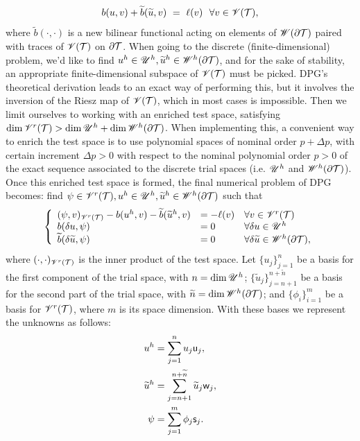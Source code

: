 % 
\begin{equation}
    b(u,v)+\widetilde{b}(\widetilde{u},v)\ =\ \ell(v)\ \ \forall v\in\mathscr{V}(\mathcal{T}),
\label{brokenvar}
\end{equation}
% 
where $\tilde{b}(\cdot,\cdot)$ is a new bilinear functional acting on elements of $\mathscr{W}(\partial\mathcal{T})$ paired with traces of $\mathscr{V}(\mathcal{T})$ on $\partial\mathcal{T}$. When going to the discrete (finite-dimensional) problem, we'd like to find $u^h\in\mathscr{U}^h, \widetilde{u}^h\in\mathscr{W}^h(\partial\mathcal{T})$, and for the sake of stability, an appropriate finite-dimensional subspace of $\mathscr{V}(\mathcal{T})$ must be picked. DPG's theoretical derivation leads to an exact way of performing this, but it involves the inversion of the Riesz map of $\mathscr{V}(\mathcal{T})$, which in most cases is impossible. Then we limit ourselves to working with an enriched test space, satisfying $\operatorname*{dim} \mathscr{V}^r(\mathcal{T})>\operatorname*{dim} \mathscr{U}^h+\operatorname*{dim}\mathscr{W}^h(\partial\mathcal{T})$. When implementing this, a convenient way to enrich the test space is to use polynomial spaces of nominal order $p+\Delta p$, with certain increment $\Delta p>0$ with respect to the nominal polynomial order $p>0$ of the exact sequence associated to the discrete trial spaces (i.e. $\mathscr{U}^h$ and $\mathscr{W}^h(\partial\mathcal{T})$). Once this enriched test space is formed, the final numerical problem of DPG becomes: find $\psi\in\mathscr{V}^r(\mathcal{T}),u^h\in\mathscr{U}^h, \widetilde{u}^h\in\mathscr{W}^h(\partial\mathcal{T})$ such that
%
\begin{equation}
\left\{
\begin{array}{lll}
    (\psi,v)_{\mathscr{V}^r(\mathcal{T})}-b(u^h,v)-\widetilde{b}(\widetilde{u}^h,v)&=-\ell(v)&\forall v\in\mathscr{V}^r(\mathcal{T})\\
    b(\delta u,\psi)&=0&\forall \delta u\in\mathscr{U}^h\\
    \widetilde{b}(\delta \widetilde{u},\psi)&=0&\forall \delta \widetilde{u}\in\mathscr{W}^h(\partial\mathcal{T}),
\end{array}\right.
\label{dpg_discrete1}
\end{equation}
%
where $(\cdot,\cdot)_{\mathscr{V}^r(\mathcal{T})}$ is the inner product of the test space. Let $\{u_j\}_{j=1}^n$ be a basis for the first component of the trial space, with $n=\operatorname*{dim} \mathscr{U}^h$; $\{\tilde{u}_j\}_{j=n+1}^{n+\tilde{n}}$ be a basis for the second part of the trial space, with $\widetilde{n}=\operatorname*{dim}\mathscr{W}^h(\partial\mathcal{T})$; and $\{\phi_i\}_{i=1}^m$ be a basis for $\mathscr{V}^r(\mathcal{T})$, where $m$ is its space dimension. With these bases we represent the unknowns as follows:
%
\begin{align}
    u^h&=\sum\limits_{j=1}^n u_j\mathsf{u}_j,\label{uhsum}\\
    \widetilde{u}^h&=\sum\limits_{j=n+1}^{n+\widetilde{n}} \widetilde{u}_j\mathsf{w}_j,\label{whsum}\\
    \psi&=\sum\limits_{j=1}^m \phi_j\mathsf{s}_j.\label{psirsum}
\end{align}

